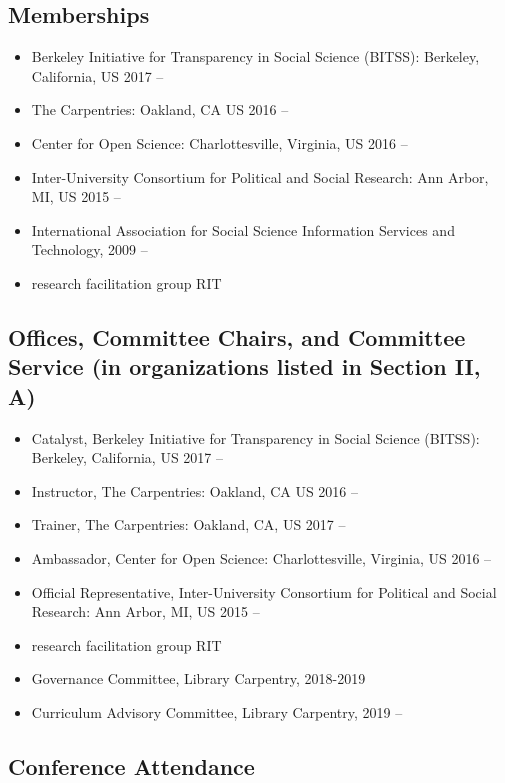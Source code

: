 \subsection{Memberships}

\begin{itemize}[label={}]
  \item Berkeley Initiative for Transparency in Social Science (BITSS): Berkeley, California, US 2017 --
  \item The Carpentries: Oakland, CA US 2016 --
  \item Center for Open Science: Charlottesville, Virginia, US 2016 --
  \item Inter-University Consortium for Political and Social Research: Ann Arbor, MI, US 2015 --
  \item International Association for Social Science Information Services and Technology, 2009 --
  \item research facilitation group RIT
\end{itemize}

\subsection{Offices, Committee Chairs, and Committee Service (in organizations listed in Section II, A)}

\begin{itemize}[label={}]
    \item Catalyst, Berkeley Initiative for Transparency in Social Science (BITSS): Berkeley, California, US 2017 --
    \item Instructor, The Carpentries: Oakland, CA US 2016 --
    \item Trainer, The Carpentries: Oakland, CA, US  2017 --
    \item Ambassador, Center for Open Science: Charlottesville, Virginia, US 2016 --
    \item Official Representative, Inter-University Consortium for Political and Social Research: Ann Arbor, MI, US 2015 --
    \item research facilitation group RIT
    \item Governance Committee, Library Carpentry, 2018-2019
    \item Curriculum Advisory Committee, Library Carpentry, 2019 --
\end{itemize}

\subsection{Conference Attendance}

